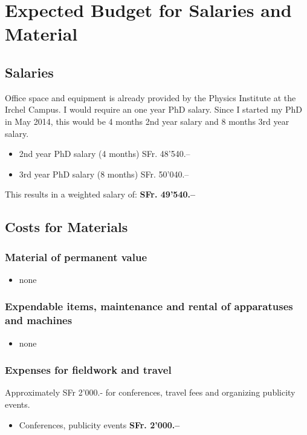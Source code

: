 \documentclass[12pt]{article}
\begin{document}
\pagestyle{empty}

\newpage

\section*{Expected Budget for Salaries and Material}

\subsection{Salaries}
Office space and equipment is already provided by the Physics Institute at the Irchel Campus.
I would require an one year PhD salary. Since I started my PhD in May 2014, this would be 4 months 2nd year salary and 8 months 3rd year salary.

\begin{itemize}
	\item 2nd year PhD salary (4 months) \hfill SFr. 48'540.--
	\item 3rd year PhD salary (8 months) \hfill SFr. 50'040.--
\end{itemize}

This results in a weighted salary of: \hfill {\bf SFr. 49'540.--}


\subsection{Costs for Materials}

\subsubsection{Material of permanent value}

\begin{itemize}
	\item none
\end{itemize}


\subsubsection{Expendable items, maintenance and rental of apparatuses and machines}

\begin{itemize}
	\item none
\end{itemize}


\subsubsection{Expenses for fieldwork and travel}
Approximately SFr 2'000.- for conferences, travel fees and organizing publicity events.
\begin{itemize}
	\item Conferences, publicity events \hfill {\bf SFr. 2'000.--}
\end{itemize}
\end{document}
